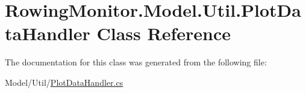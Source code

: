 \hypertarget{class_rowing_monitor_1_1_model_1_1_util_1_1_plot_data_handler}{}\section{Rowing\+Monitor.\+Model.\+Util.\+Plot\+Data\+Handler Class Reference}
\label{class_rowing_monitor_1_1_model_1_1_util_1_1_plot_data_handler}


The documentation for this class was generated from the following file\+:\begin{DoxyCompactItemize}
\item 
Model/\+Util/\hyperlink{_plot_data_handler_8cs}{Plot\+Data\+Handler.\+cs}\end{DoxyCompactItemize}
